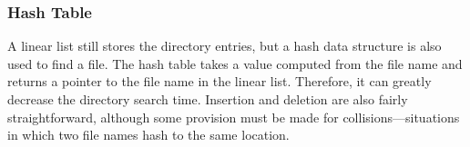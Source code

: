 \subsubsection{Hash Table}\label{subsubsec:Hash_Table_Directory}
A linear list still stores the directory entries, but a hash data structure is also used to find a file.
The hash table takes a value computed from the file name and returns a pointer to the file name in the linear list.
Therefore, it can greatly decrease the directory search time.
Insertion and deletion are also fairly straightforward, although some provision must be made for collisions—situations in which two file names hash to the same location.


